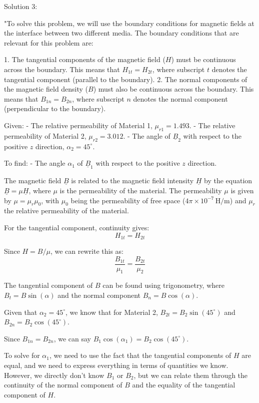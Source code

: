 Solution 3: 

"To solve this problem, we will use the boundary conditions for magnetic fields at the interface between two different media. The boundary conditions that are relevant for this problem are:

1. The tangential components of the magnetic field (\(H\)) must be continuous across the boundary. This means that \(H_{1t} = H_{2t}\), where subscript \(t\) denotes the tangential component (parallel to the boundary).
2. The normal components of the magnetic field density (\(B\)) must also be continuous across the boundary. This means that \(B_{1n} = B_{2n}\), where subscript \(n\) denotes the normal component (perpendicular to the boundary).

Given:
- The relative permeability of Material 1, \(\mu_{r1} = 1.493\).
- The relative permeability of Material 2, \(\mu_{r2} = 3.012\).
- The angle of \(\underline{B}_{2}\) with respect to the positive \(z\) direction, \(\alpha_{2} = 45^\circ\).

To find:
- The angle \(\alpha_{1}\) of \(\underline{B}_{1}\) with respect to the positive \(z\) direction.

The magnetic field \(\underline{B}\) is related to the magnetic field intensity \(\underline{H}\) by the equation \(\underline{B} = \mu \underline{H}\), where \(\mu\) is the permeability of the material. The permeability \(\mu\) is given by \(\mu = \mu_r \mu_0\), with \(\mu_0\) being the permeability of free space (\(4\pi \times 10^{-7} \, \text{H/m}\)) and \(\mu_r\) the relative permeability of the material.

For the tangential component, continuity gives:
\[H_{1t} = H_{2t}\]

Since \(H = B/\mu\), we can rewrite this as:
\[\frac{B_{1t}}{\mu_{1}} = \frac{B_{2t}}{\mu_{2}}\]

The tangential component of \(B\) can be found using trigonometry, where \(B_{t} = B \sin(\alpha)\) and the normal component \(B_{n} = B \cos(\alpha)\).

Given that \(\alpha_{2} = 45^\circ\), we know that for Material 2, \(B_{2t} = B_{2} \sin(45^\circ)\) and \(B_{2n} = B_{2} \cos(45^\circ)\).

Since \(B_{1n} = B_{2n}\), we can say \(B_{1} \cos(\alpha_{1}) = B_{2} \cos(45^\circ)\).

To solve for \(\alpha_{1}\), we need to use the fact that the tangential components of \(H\) are equal, and we need to express everything in terms of quantities we know. However, we directly don't know \(B_1\) or \(B_2\), but we can relate them through the continuity of the normal component of \(B\) and the equality of the tangential component of \(H\).

